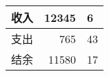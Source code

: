 \documentclass{ctexart}
\begin{document}
\begin{tabular}{|c|r@{@}l|}
	\hline
	收入 & 12345 &6  \\ \hline
	支出 & 765 &  43 \\ \hline
	结余 & 11580& 17 \\ \hline
\end{tabular}
\end{document}
